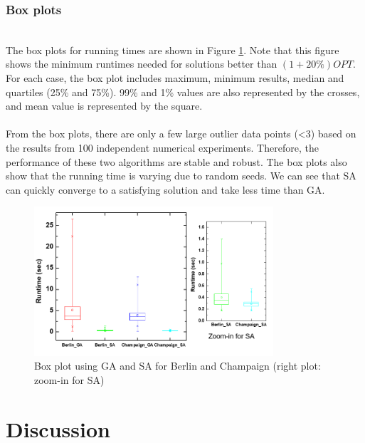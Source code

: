 \subsubsection{Box plots}
\hfill\\
The box plots for running times are shown in Figure \ref{fig: Box}. Note that this figure shows the minimum runtimes needed for solutions better than $(1+20\%) OPT$. For each case, the box plot includes maximum, minimum results, median and quartiles (25\% and 75\%). 99\% and 1\% values are also represented by the crosses, and mean value is represented by the square.\\
\hfill\\
From the box plots, there are only a few large outlier data points (<3) based on the results from 100 independent numerical experiments. Therefore, the performance of these two algorithms are stable and robust. The box plots also show that the running time is varying due to random seeds. We can see that SA can quickly converge to a satisfying solution and take less time than GA. 

\begin{figure}
\centering
\includegraphics[width=3.5in]{F5-BoxPlot}
\caption{Box plot using GA and SA for Berlin and Champaign (right plot: zoom-in for SA)}
\label{fig: Box}
\end{figure}

\section{Discussion}
